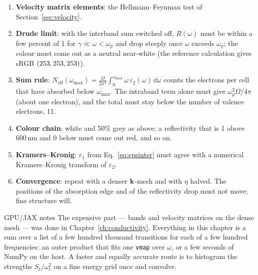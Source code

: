 \begin{enumerate}[leftmargin=2em]
\item \textbf{Velocity matrix elements}: the Hellmann--Feynman test of
Section~\ref{sec:velocity}.
\item \textbf{Drude limit}: with the interband sum switched off,
$R(\omega)$ must be within a few percent of 1 for
$\gamma\ll\omega<\omega_p$ and drop steeply once $\omega$ exceeds
$\omega_p$; the colour must come out as a neutral near-white
(the reference calculation gives sRGB $(253,253,253)$).
\item \textbf{Sum rule}: $N_{\mathrm{eff}}(\omega_{\max}) =
\frac{\Omega}{2\pi^2}\int_0^{\omega_{\max}}\omega\,\varepsilon_2(\omega)\,
\dd\omega$ counts the electrons per cell that have absorbed below
$\omega_{\max}$. The intraband term alone must give
$\omega_p^2\Omega/4\pi$ (about one electron), and the total must stay
below the number of valence electrons, 11.
\item \textbf{Colour chain}: white and 50\% grey as above; a reflectivity
that is 1 above 600\,nm and 0 below must come out red, and so on.
\item \textbf{Kramers--Kronig}: $\varepsilon_1$ from
Eq.~\eqref{eq:epsinter} must agree with a numerical Kramers--Kronig
transform of $\varepsilon_2$.
\item \textbf{Convergence}: repeat with a denser $\mathbf{k}$-mesh and with
$\eta$ halved. The positions of the absorption edge and of the
reflectivity drop must not move; fine structure will.
\end{enumerate}

\begin{gpubox}{GPU/JAX notes}
The expensive part --- bands and velocity matrices on the dense mesh ---
was done in Chapter~\ref{ch:conductivity}. Everything in this chapter is a
sum over a list of a few hundred thousand transitions for each of a few
hundred frequencies: an outer product that fits one \texttt{vmap} over $\omega$,
or a few seconds of NumPy on the host. A faster and equally accurate
route is to histogram the strengths $S_t/\omega_t^2$ on a fine energy
grid once and convolve.
\end{gpubox}
